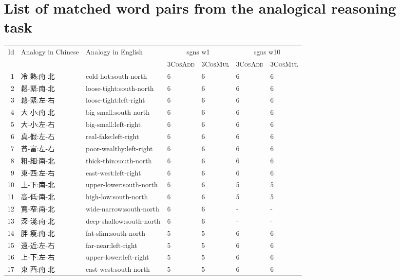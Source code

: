 \chapter{List of matched word pairs from the analogical reasoning task}

\begin{longtable}[c]{rllllll}
        \toprule
        \multirow{2}{*}{Id} &
        \multirow{2}{*}{Analogy in Chinese} &
        \multirow{2}{*}{Analogy in English} &
        \multicolumn{2}{c}{\gls{sgns} w1} &
        \multicolumn{2}{c}{\gls{sgns} w10} \\
        \cmidrule{4-7}
        &&&
        \textsc{3CosAdd} & \textsc{3CosMul} &
        \textsc{3CosAdd} & \textsc{3CosMul} \\
        \midrule
        1 & 冷-熱:南-北 & cold-hot:south-north     & 6 & 6 & 6 & 6 \\
        2 & 鬆-緊:南-北 & loose-tight:south-north  & 6 & 6 & 6 & 6 \\
        3 & 鬆-緊:左-右 & loose-tight:left-right   & 6 & 6 & 6 & 6 \\
        4 & 大-小:南-北 & big-small:south-north    & 6 & 6 & 6 & 6 \\
        5 & 大-小:左-右 & big-small:left-right     & 6 & 6 & 6 & 6 \\
        6 & 真-假:左-右 & real-fake:left-right     & 6 & 6 & 6 & 6 \\
        7 & 貧-富:左-右 & poor-wealthy:left-right  & 6 & 6 & 6 & 6 \\
        8 & 粗-細:南-北 & thick-thin:south-north   & 6 & 6 & 6 & 6 \\
        9 & 東-西:左-右 & east-west:left-right     & 6 & 6 & 6 & 6 \\
        10 & 上-下:南-北 & upper-lower:south-north  & 6 & 6 & 5 & 5 \\
        11 & 高-低:南-北 & high-low:south-north     & 6 & 6 & 5 & 5 \\
        12 & 寬-窄:南-北 & wide-narrow:south-north  & 6 & 6 & - & - \\
        13 & 深-淺:南-北 & deep-shallow:south-north & 6 & 6 & - & - \\
        14 & 胖-瘦:南-北 & fat-slim:south-north     & 5 & 5 & 6 & 6 \\
        15 & 遠-近:左-右 & far-near:left-right      & 5 & 5 & 6 & 6 \\
        16 & 上-下:左-右 & upper-lower:left-right   & 5 & 5 & 6 & 6 \\
        17 & 東-西:南-北 & east-west:south-north    & 5 & 5 & 6 & 6 \\

\end{longtable}

